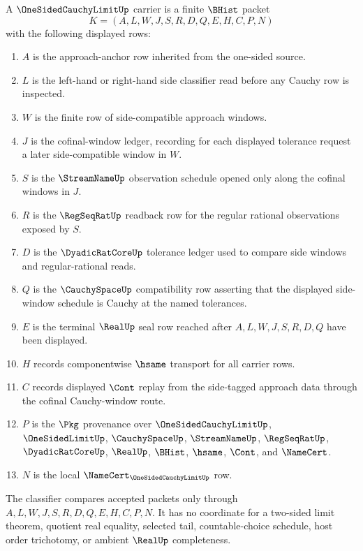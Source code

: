 \begin{definition}\label{def:one-sided-cauchy-limit-carrier}
A $\OneSidedCauchyLimitUp$ carrier is a finite $\BHist$ packet
$$
K=(A,L,W,J,S,R,D,Q,E,H,C,P,N)
$$
with the following displayed rows:
\begin{enumerate}
\item $A$ is the approach-anchor row inherited from the one-sided source.
\item $L$ is the left-hand or right-hand side classifier read before any Cauchy row is inspected.
\item $W$ is the finite row of side-compatible approach windows.
\item $J$ is the cofinal-window ledger, recording for each displayed tolerance request a later side-compatible window in $W$.
\item $S$ is the $\StreamNameUp$ observation schedule opened only along the cofinal windows in $J$.
\item $R$ is the $\RegSeqRatUp$ readback row for the regular rational observations exposed by $S$.
\item $D$ is the $\DyadicRatCoreUp$ tolerance ledger used to compare side windows and regular-rational reads.
\item $Q$ is the $\CauchySpaceUp$ compatibility row asserting that the displayed side-window schedule is Cauchy at the named tolerances.
\item $E$ is the terminal $\RealUp$ seal row reached after $A,L,W,J,S,R,D,Q$ have been displayed.
\item $H$ records componentwise $\hsame$ transport for all carrier rows.
\item $C$ records displayed $\Cont$ replay from the side-tagged approach data through the cofinal Cauchy-window route.
\item $P$ is the $\Pkg$ provenance over $\OneSidedCauchyLimitUp$, $\OneSidedLimitUp$, $\CauchySpaceUp$, $\StreamNameUp$, $\RegSeqRatUp$, $\DyadicRatCoreUp$, $\RealUp$, $\BHist$, $\hsame$, $\Cont$, and $\NameCert$.
\item $N$ is the local $\NameCert_{\OneSidedCauchyLimitUp}$ row.
\end{enumerate}
The classifier compares accepted packets only through $A,L,W,J,S,R,D,Q,E,H,C,P,N$. It has no coordinate for a two-sided limit theorem, quotient real equality, selected tail, countable-choice schedule, host order trichotomy, or ambient $\RealUp$ completeness.
\end{definition}

